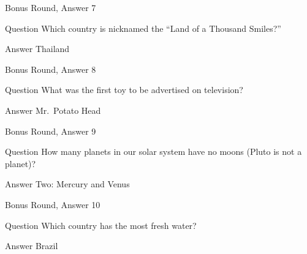\documentclass[11pt]{beamer}
\begin{document}
\begin{frame}[t]{Bonus Round, Answer 7}
  \vspace{2em}
  \begin{block}{Question}
    Which country is nicknamed the ``Land of a Thousand Smiles?''
  \end{block}
  \pause{}
  \begin{block}{Answer}
    Thailand
  \end{block}
\end{frame}


\begin{frame}[t]{Bonus Round, Answer 8}
  \vspace{2em}
  \begin{block}{Question}
    What was the first toy to be advertised on television\@?
  \end{block}
  \pause{}
  \begin{block}{Answer}
    Mr.\ Potato Head
  \end{block}
\end{frame}


\begin{frame}[t]{Bonus Round, Answer 9}
  \vspace{2em}
  \begin{block}{Question}
    How many planets in our solar system have no moons (Pluto is not a planet)\@?
  \end{block}
  \pause{}
  \begin{block}{Answer}
    Two: Mercury and Venus
  \end{block}
\end{frame}


\begin{frame}[t]{Bonus Round, Answer 10}
  \vspace{2em}
  \begin{block}{Question}
    Which country has the most fresh water\@?
  \end{block}
  \pause{}
  \begin{block}{Answer}
    Brazil
  \end{block}
\end{frame}


\end{document}
